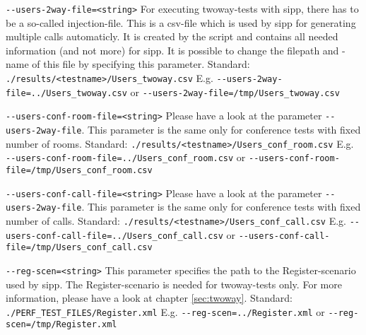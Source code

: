 \begin{description}
\item {\texttt{-{}-users-2way-file=<string>}} \newline
For executing twoway-tests with sipp, there has to be a so-called injection-file.
This is a csv-file which is used by sipp for generating multiple calls automaticly.
It is created by the script and contains all needed information (and not more)
for sipp. It is possible to change the filepath and -name of this file by specifying
this parameter.
\newline Standard: \texttt{./results/<testname>/Users\_twoway.csv}
\newline E.g. \texttt{-{}-users-2way-file=../Users\_twoway.csv}
\newline or \texttt{-{}-users-2way-file=/tmp/Users\_twoway.csv}

\item {\texttt{-{}-users-conf-room-file=<string>}} \newline
Please have a look at the parameter \texttt{-{}-users-2way-file}.
This parameter is the same only for conference tests with fixed number of rooms.
\newline Standard: \texttt{./results/<testname>/Users\_conf\_room.csv}
\newline E.g. \texttt{-{}-users-conf-room-file=../Users\_conf\_room.csv}
\newline or \texttt{-{}-users-conf-room-file=/tmp/Users\_conf\_room.csv}

\item {\texttt{-{}-users-conf-call-file=<string>}} \newline
Please have a look at the parameter \texttt{-{}-users-2way-file}.
This parameter is the same only for conference tests with fixed number of calls.
\newline Standard: \texttt{./results/<testname>/Users\_conf\_call.csv}
\newline E.g. \texttt{-{}-users-conf-call-file=../Users\_conf\_call.csv}
\newline or \texttt{-{}-users-conf-call-file=/tmp/Users\_conf\_call.csv}

\item {\texttt{-{}-reg-scen=<string>}} \newline
This parameter specifies the path to the Register-scenario used by sipp.
The Register-scenario is needed for twoway-tests only.
For more information, please have a look at chapter \ref{sec:twoway}.
\newline Standard: \texttt{./PERF\_TEST\_FILES/Register.xml}
\newline E.g. \texttt{-{}-reg-scen=../Register.xml} or \texttt{-{}-reg-scen=/tmp/Register.xml}


\end{description}
